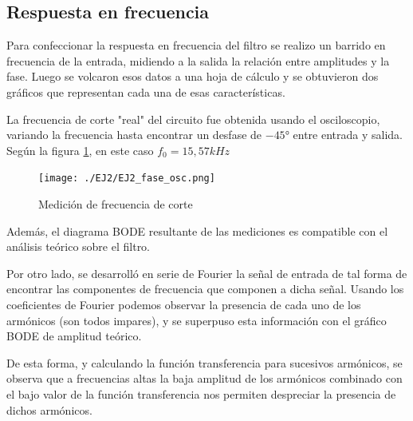\subsection{Respuesta en frecuencia}

Para confeccionar la respuesta en frecuencia del filtro se realizo un barrido en frecuencia de la entrada, midiendo a la salida la relaci\'on entre amplitudes y la fase. Luego se volcaron esos datos a una hoja de c\'alculo y se obtuvieron dos gr\'aficos que representan cada una de esas caracter\'isticas.




La frecuencia de corte "real" del circuito fue obtenida usando el osciloscopio, variando la frecuencia hasta encontrar un desfase de $-45°$ entre entrada y salida. Seg\'un la figura \ref{fig:phase_2}, en este caso $f_{0}=15,57kHz$


\begin{figure}[H]
    \centering
    \texttt{[image: ./EJ2/EJ2\_fase\_osc.png]}
    \caption{Medici\'on de frecuencia de corte}
    \label{fig:phase_2} 
\end{figure}
Adem\'as, el diagrama BODE resultante de las mediciones es compatible con el an\'alisis te\'orico sobre el filtro.

Por otro lado, se desarroll\'o en serie de Fourier la se\~nal de entrada de tal forma de encontrar las componentes de frecuencia que componen a dicha se\~nal. Usando los coeficientes de Fourier podemos observar la presencia de cada uno de los arm\'onicos (son todos impares), y se superpuso esta informaci\'on con el gr\'afico BODE de amplitud teórico.

De esta forma, y calculando la funci\'on transferencia para sucesivos arm\'onicos, se observa que a frecuencias altas la baja amplitud de los arm\'onicos combinado con el bajo valor de la funci\'on transferencia nos permiten despreciar la presencia de dichos arm\'onicos.

